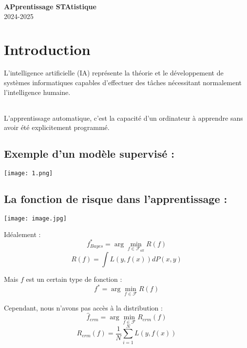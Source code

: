 \documentclass[a4paper,portrait]{article}
\begin{document}
\begin{multicols}{2}
\setlength\columnsep{20pt} %

\begin{center}
    \huge\textbf{APprentissage STAtistique}\\
     2024-2025
\end{center}

\section*{Introduction}
L'intelligence artificielle (IA) représente la théorie et le développement de systèmes informatiques capables d'effectuer des tâches nécessitant normalement l'intelligence humaine. 

\textbf{\\} L’apprentissage automatique, c’est la capacité d’un ordinateur à apprendre sans avoir été explicitement programmé.
 
\subsection{Exemple d'un modèle supervisé :}

\begin{center}
    \texttt{[image: 1.png]}
\end{center}

\subsection{La fonction de risque dans l'apprentissage :}

\begin{center}
    \texttt{[image: image.jpg]}

\end{center}
    
Idéalement :   \[
f^*_{Bayes} = \arg\min_{f \in \mathcal{F}_{all}} R(f)
\]
\[
R(f) = \int L(y, f(x)) dP(x, y)
\]

Mais \( f \) est un certain type de fonction :  
\[
f^* = \arg\min_{f \in \mathcal{F}} R(f)
\]

Cependant, nous n'avons pas accès à la distribution :  
\[
\hat{f}_{erm} = \arg\min_{f \in \mathcal{F}} R_{erm}(f)
\]
\[
R_{erm}(f) = \frac{1}{N} \sum_{i=1}^N L(y, f(x))
\]


\end{multicols}
\end{document}
